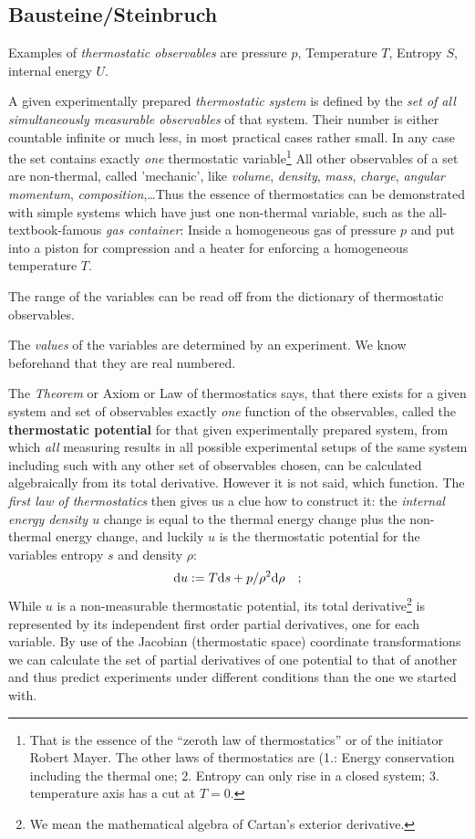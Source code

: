 \subsection{Bausteine/Steinbruch}\label{sec:thermostatik}

Examples of {\emph{thermostatic observables}} are pressure $p$, Temperature $T$, Entropy
$S$, internal energy $U$.


A given experimentally prepared {\emph{thermostatic system}} is defined by the {\emph{set
    of all simultaneously measurable observables}} of that system.  Their number is either
countable infinite or much less, in most practical cases rather small. In any case the set
contains exactly {\emph{one}} thermostatic variable\footnote{That is the essence of the
  ``zeroth law of thermostatics'' or of the initiator Robert Mayer. The other laws of
  thermostatics are (1.: Energy conservation including the thermal one; 2. Entropy can
  only rise in a closed system; 3. temperature axis has a cut at $T=0$.}  All other
observables of a set are non-thermal, called 'mechanic', like {\emph{volume}},
{\emph{density}}, {\emph{mass}}, {\emph{charge}}, {\emph{angular momentum}},
{\emph{composition}},\ldots Thus the essence of thermostatics can be demonstrated with
simple systems which have just one non-thermal variable, such as the all-textbook-famous
{\emph{gas container}}: Inside a homogeneous gas of pressure $p$ and put into a piston for
compression and a heater for enforcing a homogeneous temperature $T$.

The range of the variables can be read off from the dictionary of thermostatic
observables.

The {\emph{values}} of the variables are determined by an experiment.  We know beforehand
that they are real numbered.

The {\emph{Theorem}} or Axiom or Law of thermostatics says, that there exists for a given
system and set of observables exactly {\emph{one}} function of the observables, called the
{\textbf{thermostatic potential}} for that given experimentally prepared system, from
which {\emph{all}} measuring results in all possible experimental setups of the same
system including such with any other set of observables chosen, can be calculated
algebraically from its total derivative.  However it is not said, which function.  The
{\emph{first law of thermostatics}} then gives us a clue how to construct it: the
{\emph{internal energy density $u$}} change is equal to the thermal energy change plus the
non-thermal energy change, and luckily $u$ is the thermostatic potential for the variables
entropy $s$ and density $\rho$:
\begin{equation}
{\rm d} u := T {\rm d}s + p/\rho^2 {\rm d}\rho \quad ;
\end{equation}
While $u$ is a non-measurable thermostatic potential, its total derivative\footnote{We
  mean the mathematical algebra of Cartan's exterior derivative.} is represented by its
independent first order partial derivatives, one for each variable.  By use of the
Jacobian (thermostatic space) coordinate transformations we can calculate the set of
partial derivatives of one potential to that of another and thus predict experiments under
different conditions than the one we started with.

